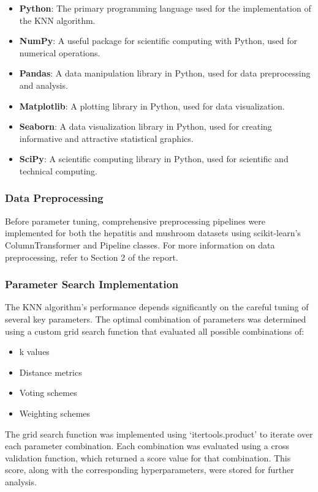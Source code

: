 \begin{itemize}
    \item \textbf{Python}: The primary programming language used for the implementation of the KNN algorithm.
    \item \textbf{NumPy}: A useful package for scientific computing with Python, used for numerical operations.
    \item \textbf{Pandas}: A data manipulation library in Python, used for data preprocessing and analysis.
    \item \textbf{Matplotlib}: A plotting library in Python, used for data visualization.
    \item \textbf{Seaborn}: A data visualization library in Python, used for creating informative and attractive statistical graphics.
    \item \textbf{SciPy}: A scientific computing library in Python, used for scientific and technical computing.
\end{itemize}

\subsubsection*{Data Preprocessing}
Before parameter tuning, comprehensive preprocessing pipelines were implemented for both the hepatitis
and mushroom datasets using scikit-learn's ColumnTransformer and Pipeline classes.
For more information on data preprocessing, refer to Section 2 of the report.

\subsubsection*{Parameter Search Implementation}
The KNN algorithm's performance depends significantly on the careful tuning of several key parameters.
The optimal combination of parameters was determined using a custom grid search function that evaluated all possible combinations of:
\begin{itemize}
    \item k values
    \item Distance metrics
    \item Voting schemes
    \item Weighting schemes
\end{itemize}

The grid search function was implemented using `itertools.product' to iterate over each parameter combination.
Each combination was evaluated using a cross validation function, which returned a score value for that combination.
This score, along with the corresponding hyperparameters, were stored for further analysis.

